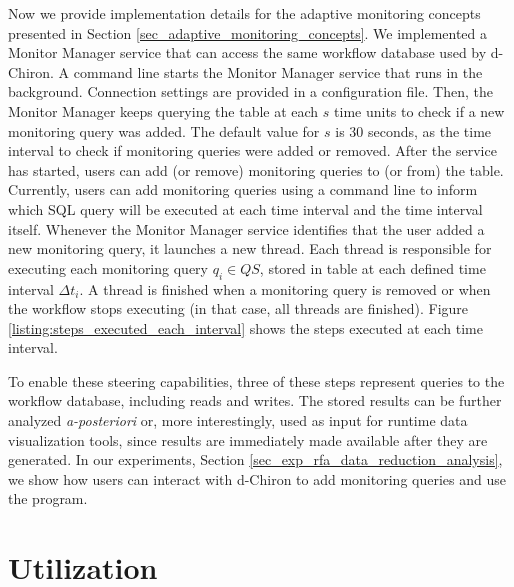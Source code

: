 Now we provide implementation details for the adaptive monitoring concepts presented in Section \ref{sec_adaptive_monitoring_concepts}.
We implemented a Monitor Manager service that can access the same workflow database used by d-Chiron. A command line starts the Monitor Manager service that runs in the background.
Connection settings
are provided in a configuration file.
Then, the Monitor Manager
keeps querying the  table at each $s$ time units to
check if a new monitoring query was added. The default value for $s$
is 30 seconds, as the time interval to check if monitoring queries were
added or removed.
After the service has
started, users can add (or remove) monitoring queries to (or from) the
 table.
Currently, users can add monitoring queries
using a command line to inform which SQL query will be executed at each
time interval and the time interval itself.
Whenever the Monitor Manager service
identifies that the user added a new monitoring query, it launches a new
thread. Each thread is responsible for executing each monitoring query $q_i \in QS$, stored in table  at each defined time interval $\Delta t_i$. A thread is finished
when a monitoring query is removed or when the workflow stops executing
(in that case, all threads are finished).
Figure \ref{listing:steps_executed_each_interval} shows the steps
executed at each time interval.




To enable these steering capabilities, three of these steps
represent queries to the workflow database, including reads and writes. The
stored results can be further analyzed \emph{a-posteriori} or, more
interestingly, used as input for runtime data visualization tools, since
results are immediately made available after they are generated. In our experiments, Section \ref{sec_exp_rfa_data_reduction_analysis}, we show how users can interact with d-Chiron to add
monitoring queries and use the  program.


\section{Utilization}
\label{dchiron-utilization}


